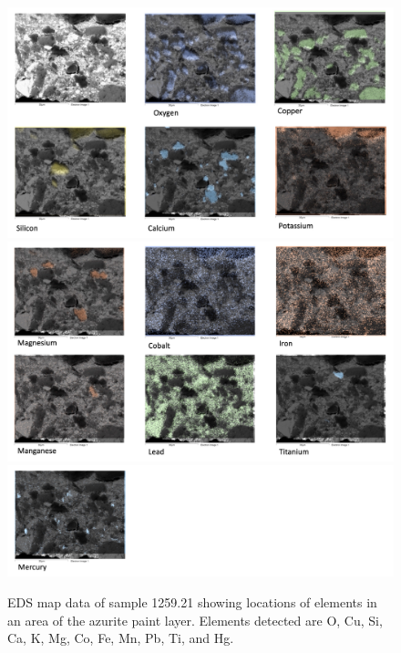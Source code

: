 \begin{figure}[H]
\centering
\begin{minipage}[t]{\linewidth}
  \centering
  \includegraphics[width=0.9\linewidth]{1259-21_mapdata_1}
\hfill
\includegraphics[width=0.9\linewidth]{1259-21_mapdata_2}
\hfill
\includegraphics[width=0.9\linewidth]{1259-21_mapdata_3}
\hfill
\end{minipage}
\caption[EDS map data, sample 1259.21.]{EDS map data of sample 1259.21 showing locations of elements in an area of the azurite paint layer. Elements detected are O, Cu, Si, Ca, K, Mg, Co, Fe, Mn, Pb, Ti, and Hg.}
\label{fig:1259.21_mapdata}
\end{figure}


